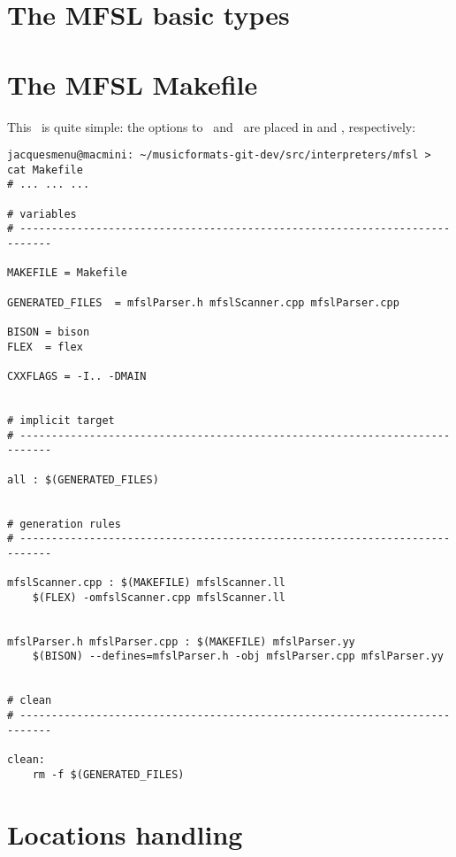 \section{The MFSL basic types}



\section{The MFSL Makefile}\label{The MFSL Makefile}

This \Makefile\ is quite simple: the options to \flex\ and \bison\ are placed in  and , respectively:
\begin{lstlisting}[language=Terminal]
jacquesmenu@macmini: ~/musicformats-git-dev/src/interpreters/mfsl > cat Makefile
# ... ... ...

# variables
# ---------------------------------------------------------------------------

MAKEFILE = Makefile

GENERATED_FILES  = mfslParser.h mfslScanner.cpp mfslParser.cpp

BISON = bison
FLEX  = flex

CXXFLAGS = -I.. -DMAIN


# implicit target
# ---------------------------------------------------------------------------

all : $(GENERATED_FILES)


# generation rules
# ---------------------------------------------------------------------------

mfslScanner.cpp : $(MAKEFILE) mfslScanner.ll
	$(FLEX) -omfslScanner.cpp mfslScanner.ll


mfslParser.h mfslParser.cpp : $(MAKEFILE) mfslParser.yy
	$(BISON) --defines=mfslParser.h -obj mfslParser.cpp mfslParser.yy


# clean
# ---------------------------------------------------------------------------

clean:
	rm -f $(GENERATED_FILES)
\end{lstlisting}


\section{Locations handling}\label{Locations handling}

